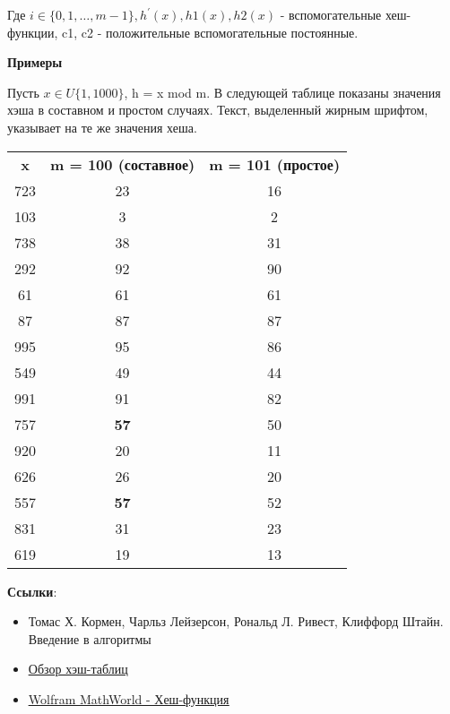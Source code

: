 Где $i \in \{0, 1, \dots, m-1\}, h^{'}(x), h1(x), h2(x)$ - вспомогательные хеш-функции, c1, c2 - положительные вспомогательные постоянные.

\textbf{Примеры}

Пусть $x \in U\{1, 1000\}$, h = x mod m. В следующей таблице показаны значения хэша в составном и простом случаях. Текст, выделенный жирным шрифтом, указывает на те же значения хеша.

\begin{tabular}{ccc}
\textbf{x} & \textbf{m = 100 (составное)} & \textbf{m = 101 (простое)} \\
723 & 23 & 16 \\
103 & 3 & 2 \\
738 & 38 & 31 \\
292 & 92 & 90 \\
61 & 61 & 61 \\
87 & 87 & 87 \\
995 & 95 & 86 \\
549 & 49 & 44 \\
991 & 91 & 82 \\
757 & \textbf{57} & 50 \\
920 & 20 & 11 \\
626 & 26 & 20 \\
557 & \textbf{57} & 52 \\
831 & 31 & 23 \\
619 & 19 & 13 \\
\end{tabular}

\vspace{\baselineskip}

\textbf{Ссылки}:

\begin{itemize}
    \item Томас Х. Кормен, Чарльз Лейзерсон, Рональд Л. Ривест, Клиффорд Штайн. Введение в алгоритмы
    \item \href{https://courses.csail.mit.edu/6.006/spring11/rec/rec05.pdf}{\underline{Обзор хэш-таблиц}}
    \item \href{https://mathworld.wolfram.com/HashFunction.html}{\underline{Wolfram MathWorld - Хеш-функция}}
\end{itemize}